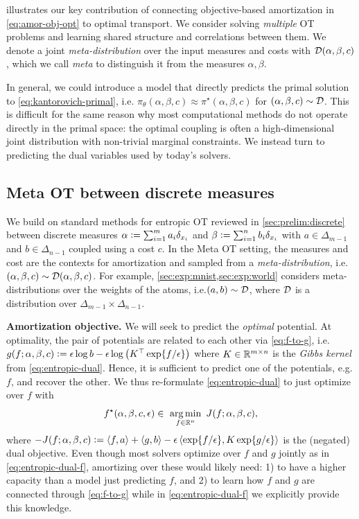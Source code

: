 \documentclass{article}
\newcommand{\eg}{e.g.\xspace}
\newcommand{\ie}{i.e.\xspace}
\newcommand{\defeq}{\vcentcolon=}
\begin{document}
 illustrates our key contribution of connecting
objective-based amortization in \cref{eq:amor-obj-opt} to
optimal transport. We consider solving \emph{multiple} OT problems
and learning shared structure and correlations between them.
We denote a joint \emph{meta-distribution} over the input
measures and costs with ${\mathcal{D}}(\alpha,\beta,c)$, which we call \emph{meta}
to distinguish it from the measures $\alpha,\beta$.

In general, we could introduce a model that directly predicts
the primal solution to \cref{eq:kantorovich-primal}, \ie
$\pi_\theta(\alpha, \beta, c)\approx \pi^\star(\alpha, \beta, c)$
for $(\alpha, \beta, c)\sim {\mathcal{D}}$.
This is difficult for the same reason why most computational methods
do not operate directly in the primal space: the optimal coupling
is often a high-dimensional joint distribution with
non-trivial marginal constraints.
We instead turn to predicting the dual variables used by today's solvers.

\subsection{Meta OT between discrete measures}
\label{sec:meta-ot:discrete}

We build on standard methods for entropic OT
reviewed in \cref{sec:prelim:discrete} between discrete measures
$\alpha \defeq \sum_{i=1}^m a_i \delta_{x_i}$ and $\beta \defeq \sum_{i=1}^n b_i \delta_{x_i}$
with $a \in \Delta_{m-1}$ and $b\in \Delta_{n-1}$
coupled using a cost $c$.
In the Meta OT setting, the measures and cost are the contexts for
amortization and sampled from a
\emph{meta-distribution}, \ie $(\alpha,\beta,c)\sim{\mathcal{D}}(\alpha,\beta,c)$.
For example, \cref{sec:exp:mnist,sec:exp:world} considers meta-distributions
over the weights of the atoms, \ie $(a,b)\sim{\mathcal{D}}$, where
${\mathcal{D}}$ is a distribution over $\Delta_{m-1} \times \Delta_{n-1}$.

\textbf{Amortization objective.}
We will seek to predict the \emph{optimal} potential.
At optimality, the pair of potentials are related to each
other via \cref{eq:f-to-g}, \ie
$g(f; \alpha, \beta, c) \defeq \epsilon \log b - \epsilon\log\left(K^\top \exp\{f/\epsilon\}\right)$
where $K\in\mathbb{R}^{m\times n}$ is the \emph{Gibbs kernel}
from \cref{eq:entropic-dual}.
Hence, it is sufficient to predict one of the
potentials, \eg $f$, and recover the other.
We thus re-formulate \cref{eq:entropic-dual}
to just optimize over $f$ with
\begin{equation}
  f^\star(\alpha, \beta, c, \epsilon)\in\ \operatorname*{arg\,min}_{f\in\mathbb{R}^n}\ J(f; \alpha, \beta, c),
  \label{eq:entropic-dual-f}
\end{equation}
where $-J(f; \alpha, \beta, c)\defeq \langle f, a\rangle + \langle g, b \rangle
    - \epsilon\left\langle \exp\{f/\epsilon\}, K\exp\{g/\epsilon\}\right\rangle$
is the (negated) dual objective.
Even though most solvers optimize over $f$ and $g$ jointly
as in \cref{eq:entropic-dual-f}, amortizing over these would likely need:
1) to have a higher capacity than a model just predicting $f$, and
2) to learn how $f$ and $g$ are connected through \cref{eq:f-to-g} while
in \cref{eq:entropic-dual-f} we explicitly provide this knowledge.
\end{document}
